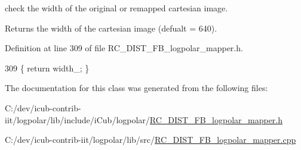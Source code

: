check the width of the original or remapped cartesian image. 

\begin{DoxyReturn}{Returns}
the width of the cartesian image (defualt = 640). 
\end{DoxyReturn}


Definition at line 309 of file R\+C\+\_\+\+D\+I\+S\+T\+\_\+\+F\+B\+\_\+logpolar\+\_\+mapper.\+h.


\begin{DoxyCode}
309 \{ \textcolor{keywordflow}{return} width\_; \}
\end{DoxyCode}


The documentation for this class was generated from the following files\+:\begin{DoxyCompactItemize}
\item 
C\+:/dev/icub-\/contrib-\/iit/logpolar/lib/include/i\+Cub/logpolar/\hyperlink{RC__DIST__FB__logpolar__mapper_8h}{R\+C\+\_\+\+D\+I\+S\+T\+\_\+\+F\+B\+\_\+logpolar\+\_\+mapper.\+h}\item 
C\+:/dev/icub-\/contrib-\/iit/logpolar/lib/src/\hyperlink{RC__DIST__FB__logpolar__mapper_8cpp}{R\+C\+\_\+\+D\+I\+S\+T\+\_\+\+F\+B\+\_\+logpolar\+\_\+mapper.\+cpp}\end{DoxyCompactItemize}
